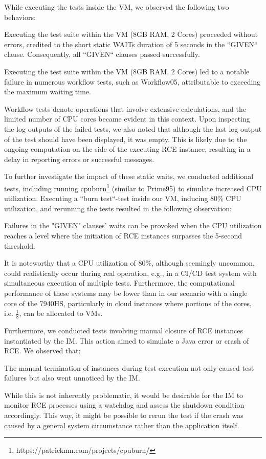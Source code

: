 While executing the tests inside the \ac{VM}, we observed the following two behaviors:
\begin{observation}
    Executing the test suite within the VM (8GB RAM, 2 Cores) proceeded without errors, credited to the short static WAITs duration of 5 seconds in the ``GIVEN`` clause. Consequently, all ``GIVEN`` clauses passed successfully.
\end{observation}
\begin{observation}
    Executing the test suite within the VM (8GB RAM, 2 Cores) led to a notable failure in numerous workflow tests, such as Workflow05, attributable to exceeding the maximum waiting time.
\end{observation}
Workflow tests denote operations that involve extensive calculations, and the limited number of CPU cores became evident in this context. Upon inspecting the log outputs of the failed tests, we also noted that although the last log output of the test should have been displayed, it was empty. This is likely due to the ongoing computation on the side of the executing \ac{RCE} instance, resulting in a delay in reporting errors or successful messages.

To further investigate the impact of these static waits, we conducted additional tests, including running cpuburn\footnote{https://patrickmn.com/projects/cpuburn/} (similar to Prime95) to simulate increased CPU utilization. Executing a ``burn test``-test inside our VM, inducing 80\% CPU utilization, and rerunning the tests resulted in the following observation:
\begin{observation}
    Failures in the "GIVEN" clauses' waits can be provoked when the CPU utilization reaches a level where the initiation of RCE instances surpasses the 5-second threshold.
\end{observation}

It is noteworthy that a CPU utilization of 80\%, although seemingly uncommon, could realistically occur during real operation, e.g., in a CI/CD test system with simultaneous execution of multiple tests. Furthermore, the computational performance of these systems may be lower than in our scenario with a single core of the 7940HS, particularly in cloud instances where portions of the cores, i.e. $\frac{1}{8}$, can be allocated to \acp{VM}.

\newpage
Furthermore, we conducted tests involving manual closure of \ac{RCE} instances instantiated by the \ac{IM}. This action aimed to simulate a Java error or crash of \ac{RCE}. We observed that:
\begin{observation}
    The manual termination of instances during test execution not only caused test failures but also went unnoticed by the \acl{IM}.
\end{observation}
While this is not inherently problematic, it would be desirable for the \ac{IM} to monitor \ac{RCE} processes using a watchdog and assess the shutdown condition accordingly. This way, it might be possible to rerun the test if the crash was caused by a general system circumstance rather than the application itself.

